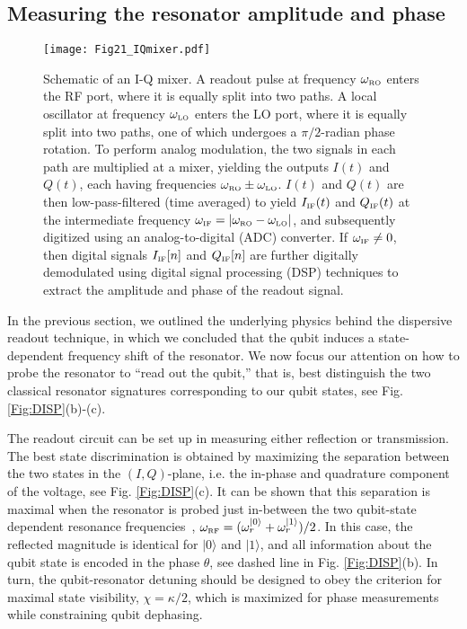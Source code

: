 \documentclass[aip,apr,twocolumn,showpacs,superscriptaddress,groupedaddress,nofootinbib,reprint]{revtex4-1}  %
\begin{document}
\subsection{Measuring the resonator amplitude and phase}

\begin{figure}[!t]
\begin{center}
\texttt{[image: Fig21\_IQmixer.pdf]}
\caption{Schematic of an I-Q mixer. A readout pulse at frequency $\omega_{\mbox{\tiny{RO}}}$ enters the RF port, where it is equally split into two paths. A local oscillator at frequency $\omega_{\mbox{\tiny{LO}}}$ enters the LO port, where it is equally split into two paths, one of which undergoes a $\pi/2$-radian phase rotation. To perform analog modulation, the two signals in each path are multiplied at a mixer, yielding the outputs $I(t)$ and $Q(t)$, each having frequencies $\omega_{\mbox{\tiny{RO}}} \pm \omega_{\mbox{\tiny{LO}}}$. $I(t)$ and $Q(t)$ are then low-pass-filtered (time averaged) to yield $I_{\mbox{\tiny{IF}}}(t)$ and $Q_{\mbox{\tiny{IF}}}(t)$ at the intermediate frequency $\omega_{\mbox{\tiny{IF}}} = |\omega_{\mbox{\tiny{RO}}} - \omega_{\mbox{\tiny{LO}}}|$, and subsequently digitized using an analog-to-digital (ADC) converter. If $\omega_{\mbox{\tiny{IF}}} \neq 0$, then digital signals $I_{\mbox{\tiny{IF}}}[n]$ and $Q_{\mbox{\tiny{IF}}}[n]$ are further digitally demodulated using digital signal processing (DSP) techniques to extract the amplitude and phase of the readout signal.}
\label{Fig:IQ-mixer}
\end{center}
\end{figure}


In the previous section, we outlined the underlying physics behind the dispersive readout technique, in which we concluded that the qubit induces a state-dependent frequency shift of the resonator. %
We now focus our attention on how to %
probe the resonator to ``read out the qubit,'' that is, best distinguish the two classical resonator signatures corresponding to our qubit states, see Fig. \ref{Fig:DISP}(b)-(c).

The readout circuit can be set up in measuring either reflection or transmission. The best state discrimination is obtained by maximizing the separation between the two states in the $(I,Q)$-plane, i.e. the in-phase and quadrature component of the voltage, see Fig. \ref{Fig:DISP}(c). It can be shown that this separation is maximal when the resonator is probed just in-between the two qubit-state dependent resonance frequencies~\cite{SankPhD2014}, $\omega_{\mbox{\tiny{RF}}} = (\omega_{r}^{|0\rangle} + \omega_{r}^{|1\rangle})/2$. In this case, the reflected magnitude is identical for $|0\rangle$ and $|1\rangle$, and all information about the qubit state is encoded in the phase $\theta$, see dashed line in Fig. \ref{Fig:DISP}(b). In turn, the qubit-resonator detuning should be designed to obey the criterion for maximal state visibility, $\chi = \kappa/2$, which is maximized for phase measurements while constraining qubit dephasing.
\end{document}
